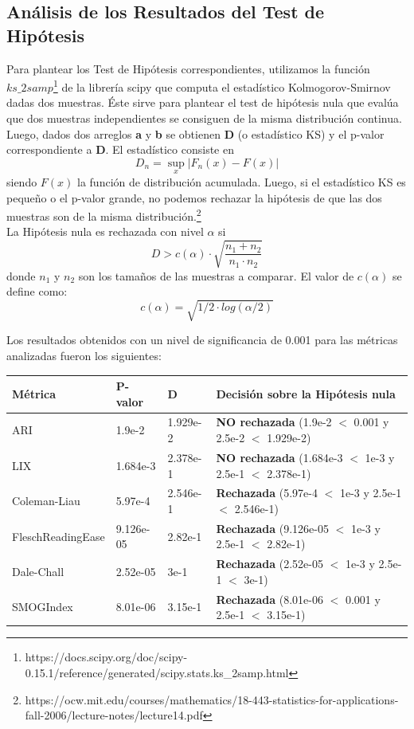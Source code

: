 \documentclass[12pt,journal,compsoc]{IEEEtran}
\begin{document}
\subsection{Análisis de los Resultados del Test de Hipótesis}

Para plantear los Test de Hipótesis correspondientes, utilizamos la función $ks\_2samp$\footnote{https://docs.scipy.org/doc/scipy-0.15.1/reference/generated/scipy.stats.ks\_2samp.html} de la librería scipy que computa el estadístico Kolmogorov-Smirnov dadas dos muestras. Éste sirve para plantear el test de hipótesis nula que evalúa que dos muestras independientes se consiguen de la misma distribución continua.\\

Luego, dados dos arreglos \textbf{a} y \textbf{b} se obtienen \textbf{D} (o estadístico KS) y el p-valor correspondiente a \textbf{D}. El estadístico consiste en
$$D_{n}=\sup_{x}|F_{n}(x)-F(x)|$$
siendo $F(x)$ la función de distribución acumulada. Luego, si el estadístico KS es pequeño o el p-valor grande, no podemos rechazar la hipótesis de que las dos muestras son de la misma distribución.\footnote{https://ocw.mit.edu/courses/mathematics/18-443-statistics-for-applications-fall-2006/lecture-notes/lecture14.pdf}\\

La Hipótesis nula es rechazada con nivel $\alpha$ si $$D > c(\alpha) \cdot \sqrt{\frac{n_1+n_2}{n_1\cdot n_2}}$$ donde $n_1$ y $n_2$ son los tamaños de las muestras a comparar. El valor de $c(\alpha)$ se define como:
$$c(\alpha) = \sqrt{1/2\cdot log(\alpha/2)}$$

Los resultados obtenidos con un nivel de significancia de 0.001 para las métricas analizadas fueron los siguientes:\\

\begin{tabular}{ | l | l | l | l | }
\hline
Métrica & P-valor & D & Decisión sobre la Hipótesis nula\\
\hline
ARI & 1.9e-2 & 1.929e-2 & \textbf{NO rechazada} (1.9e-2 $<$ 0.001 y 2.5e-2 $<$ 1.929e-2)\\
\hline
LIX & 1.684e-3 & 2.378e-1 & \textbf{NO rechazada} (1.684e-3 $<$ 1e-3 y 2.5e-1 $<$ 2.378e-1)\\
\hline
Coleman-Liau & 5.97e-4 & 2.546e-1 & \textbf{Rechazada} (5.97e-4 $<$ 1e-3 y 2.5e-1 $<$ 2.546e-1)\\
\hline
FleschReadingEase & 9.126e-05 & 2.82e-1 & \textbf{Rechazada} (9.126e-05 $<$ 1e-3 y 2.5e-1 $<$ 2.82e-1)\\
\hline
Dale-Chall & 2.52e-05 & 3e-1 & \textbf{Rechazada} (2.52e-05 $<$ 1e-3 y 2.5e-1 $<$ 3e-1)\\
\hline
SMOGIndex & 8.01e-06 & 3.15e-1 & \textbf{Rechazada} (8.01e-06 $<$ 0.001 y 2.5e-1 $<$ 3.15e-1)\\
\hline
\end{tabular}
\end{document}
